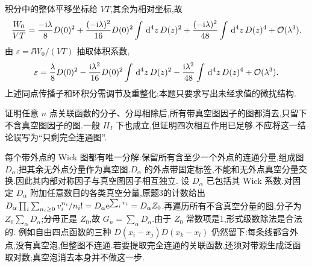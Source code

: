 \begin{solution}
\begin{center}
\end{center}
积分中的整体平移坐标给 $VT$,其余为相对坐标,故
\[
\frac{W_0}{VT}=\frac{-\mathrm i\lambda}{8}D(0)^2
+\frac{(-\mathrm i\lambda)^2}{16}D(0)^2\int\,\mathrm d^4z\,D(z)^2
+\frac{(-\mathrm i\lambda)^2}{48}\int\,\mathrm d^4z\,D(z)^4+\mathcal O(\lambda^3).
\]
由 $\varepsilon=\ii W_0/(VT)$ 抽取体积系数,
\[
\varepsilon=\frac\lambda8D(0)^2-\frac{\mathrm i\lambda^2}{16}D(0)^2\int\,\mathrm d^4z\,D(z)^2
-\frac{\mathrm i\lambda^2}{48}\int\,\mathrm d^4z\,D(z)^4+\mathcal O(\lambda^3).
\]
上述同点传播子和环积分需调节及重整化;本题只要求写出未经求值的微扰结构.
\end{solution}

\begin{exercise}
证明任意 $n$ 点关联函数的分子、分母相除后,所有带真空图因子的图都消去,只留下不含真空图因子的图.一般 $H_I$ 下也成立,但证明四次相互作用已足够.不应将这一结论误写为“只剩完全连通图”.
\end{exercise}
\begin{solution}
每个带外点的 Wick 图都有唯一分解:保留所有含至少一个外点的连通分量,组成图 $D_\alpha$;把其余无外点分量作为真空图.$D_\alpha$ 的外点带固定标签,不能和无外点真空分量交换.因此其内部对称因子与真空图因子相互独立.
设 $D_\alpha$ 已包括其 Wick 系数.对固定 $D_\alpha$ 附加任意数目的各类真空分量,原题3的计数给出
$D_\alpha\prod_i\sum_{n_i\ge0}v_i^{n_i}/n_i!=D_\alpha\mathrm e^{\sum_i v_i}=D_\alpha Z_0$.再遍历所有不含真空分量的图,分子为 $Z_0\sum_\alpha D_\alpha$;分母正是 $Z_0$,故 $G_n=\sum_\alpha D_\alpha$.由于 $Z_0$ 常数项是1,形式级数除法是合法的.
例如自由四点函数的三种 $D(x_i-x_j)D(x_k-x_l)$ 仍然留下:每条线都含外点,没有真空泡,但整图不连通.若要提取完全连通的关联函数,还须对带源生成泛函取对数;真空泡消去本身并不做这一步.
\end{solution}
